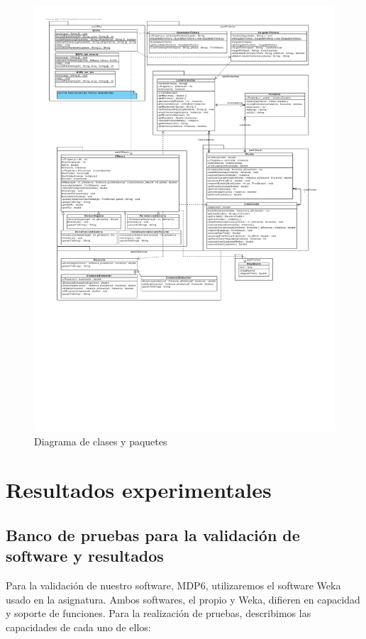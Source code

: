 \documentclass[a4paper]{report}
\begin{document}
\begin{figure}[!h]
	\centering
	\includegraphics[width=1.1\textwidth, clip=true,trim=1cm 8cm 1.2cm 1cm]{./Figuras/clases.pdf}
	\caption{Diagrama de clases y paquetes}
	\label{fig:clases}
\end{figure}

\chapter{Resultados experimentales}

	\section{Banco de pruebas para la validación de software y resultados}
	
	Para la validación de nuestro software, MDP6, utilizaremos el software Weka usado en la asignatura. Ambos softwares, el propio y Weka, difieren en capacidad y soporte de funciones. Para la realización de pruebas, describimos las capacidades de cada uno de ellos:
	
\end{document}
